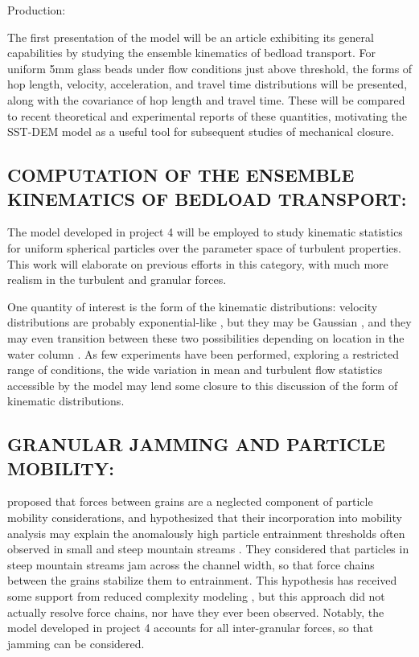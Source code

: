 Production: 

The first presentation of the model will be an article exhibiting its general capabilities by studying the ensemble kinematics of bedload transport. For uniform 5mm glass beads under flow conditions just above threshold, the forms of hop length, velocity, acceleration, and travel time distributions will be presented, along with the covariance of hop length and travel time. These will be compared to recent theoretical \citep{Furbish2012,Furbish2016} and experimental \citep{Lajeunesse2010, Roseberry2012, Ancey2014, Fathel2015, Heyman2016} reports of these quantities, motivating the SST-DEM model as a useful tool for subsequent studies of mechanical closure.   


\subsection{COMPUTATION OF THE ENSEMBLE KINEMATICS OF BEDLOAD TRANSPORT:}

The model developed in project 4 will be employed to study kinematic statistics for uniform spherical particles over the parameter space of turbulent properties. This work will elaborate on previous efforts \citep[e.g.][]{Bialik2010, Ancey2014, Fan2014} in this category, with much more realism in the turbulent and granular forces. 
\bigskip 

One quantity of interest is the form of the kinematic distributions: velocity distributions are probably exponential-like \citep{Roseberry2012, Furbish2013,Fan2014, Fathel2015, Furbish2016}, but they may be Gaussian \citep{Lajeunesse2010, Ancey2014}, and they may even transition between these two possibilities depending on location in the water column \citep{Heyman2016}. As few experiments have been performed, exploring a restricted range of conditions, the wide variation in mean and turbulent flow statistics accessible by the model may lend some closure to this discussion of the form of kinematic distributions.  

\subsection{GRANULAR JAMMING AND PARTICLE MOBILITY:}

\cite{Zimmermann2010} proposed that forces between grains are a neglected component of particle mobility considerations, and hypothesized that their incorporation into mobility analysis may explain the anomalously high particle entrainment thresholds often observed in small and steep mountain streams \citep{Prancevic2015}. They considered that particles in steep mountain streams jam across the channel width, so that force chains between the grains stabilize them to entrainment. This hypothesis has received some support from reduced complexity modeling \citep{Saletti2016, Saletti2016a}, but this approach did not actually resolve force chains, nor have they ever been observed. Notably, the model developed in project 4 accounts for all inter-granular forces, so that jamming can be considered.  
\bigskip 

